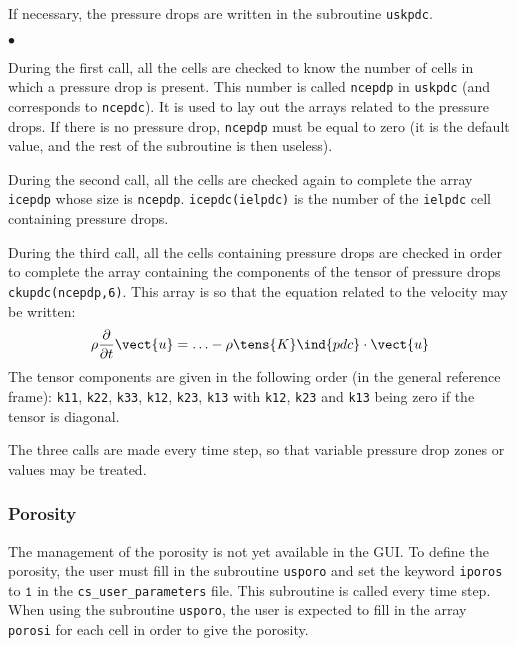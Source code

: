 {{{If necessary, the pressure drops are written in the
subroutine \texttt{uskpdc}.

\begin{list}{$\bullet$}{}
\item During the first call, all the cells are checked to know the
      number of cells in which a pressure drop is present.
      This number is called \texttt{ncepdp} in
      \texttt{uskpdc} (and corresponds to
      \texttt{ncepdc}). It is used to lay out the arrays
      related to the pressure drops. If there is no pressure drop,
      \texttt{ncepdp} must be equal to zero (it is the default value, and the
      rest of the subroutine is then useless).

\item During the second call, all the cells are checked again to
      complete the array \texttt{icepdp} whose size is
      \texttt{ncepdp}. \mbox{\texttt{icepdc(ielpdc)}} is the number of the
      \texttt{ielpdc}\raisebox{1ex}{\small th} cell containing pressure drops.

\item During the third call, all the cells containing pressure drops
      are checked in order to complete the array
      containing the components of the tensor of pressure drops
      \mbox{\texttt{ckupdc(ncepdp,6)}}. This array is so that
      the equation related to the velocity may be written:
\begin{displaymath}
\rho\frac{\partial}{\partial t}\vect{u}=\ldots -\rho\tens{K}\ind{pdc}\cdot\vect{u}
\end{displaymath}
The tensor components are given in the following order (in the general
      reference frame): \texttt{k11}, \texttt{k22}, \texttt{k33}, \texttt{k12},
      \texttt{k23}, \texttt{k13} with \texttt{k12}, \texttt{k23} and \texttt{k13}
      being zero if the tensor is diagonal.

\end{list}


The three calls are made every time step, so that variable pressure drop
zones or values may be treated.

\subsubsection{Porosity}

The management of the porosity is not yet available in the GUI. To define the porosity, the user
must fill in the subroutine \texttt{usporo} and set the keyword \texttt{iporos} to $\texttt{1}$ in the
\texttt{cs\_user\_parameters} file. This subroutine is called every time step.\\
When using the subroutine \texttt{usporo}, the user is expected to fill in the array \texttt{porosi}
for each cell in order to give the porosity.

}}}
